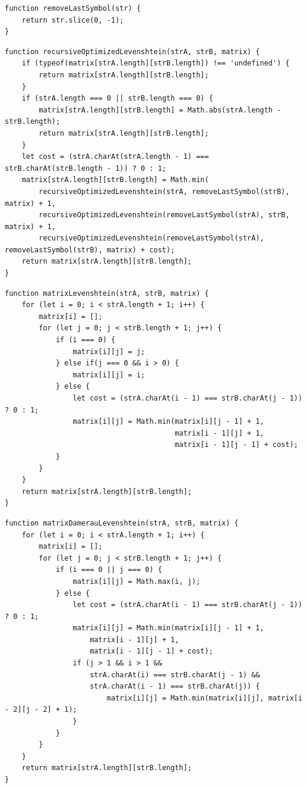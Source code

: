 \documentclass[12pt]{report}
\begin{document}
\begin{lstlisting}[label=some-code,caption=Функция удаления последнего символа в строке]
function removeLastSymbol(str) {
    return str.slice(0, -1);
}
\end{lstlisting}

\begin{lstlisting}[label=some-code,caption=Функция нахождения расстояния Левенштейна рекурсивно с матрицей]
function recursiveOptimizedLevenshtein(strA, strB, matrix) {
    if (typeof(matrix[strA.length][strB.length]) !== 'undefined') {
        return matrix[strA.length][strB.length];
    } 
    if (strA.length === 0 || strB.length === 0) {
        matrix[strA.length][strB.length] = Math.abs(strA.length - strB.length);
        return matrix[strA.length][strB.length];
    }
    let cost = (strA.charAt(strA.length - 1) === strB.charAt(strB.length - 1)) ? 0 : 1;
    matrix[strA.length][strB.length] = Math.min(
        recursiveOptimizedLevenshtein(strA, removeLastSymbol(strB), matrix) + 1,
        recursiveOptimizedLevenshtein(removeLastSymbol(strA), strB, matrix) + 1,
        recursiveOptimizedLevenshtein(removeLastSymbol(strA), removeLastSymbol(strB), matrix) + cost);
    return matrix[strA.length][strB.length];
}
\end{lstlisting}


\begin{lstlisting}[label=some-code,caption=Функция нахождения расстояния Левенштейна матрично]
function matrixLevenshtein(strA, strB, matrix) {
    for (let i = 0; i < strA.length + 1; i++) {
        matrix[i] = [];
        for (let j = 0; j < strB.length + 1; j++) {
            if (i === 0) {
                matrix[i][j] = j;
            } else if(j === 0 && i > 0) {
                matrix[i][j] = i;
            } else {
                let cost = (strA.charAt(i - 1) === strB.charAt(j - 1)) ? 0 : 1;
                matrix[i][j] = Math.min(matrix[i][j - 1] + 1,
                                        matrix[i - 1][j] + 1,
                                        matrix[i - 1][j - 1] + cost);
            }
        }
    }
    return matrix[strA.length][strB.length];
}
\end{lstlisting}

\begin{lstlisting}[label=some-code,caption=Функция нахождения расстояния Дамерау-Левенштейна матрично]
function matrixDamerauLevenshtein(strA, strB, matrix) {
    for (let i = 0; i < strA.length + 1; i++) {
        matrix[i] = [];
        for (let j = 0; j < strB.length + 1; j++) {
            if (i === 0 || j === 0) {
                matrix[i][j] = Math.max(i, j);
            } else {
                let cost = (strA.charAt(i - 1) === strB.charAt(j - 1)) ? 0 : 1;
                matrix[i][j] = Math.min(matrix[i][j - 1] + 1,
                    matrix[i - 1][j] + 1,
                    matrix[i - 1][j - 1] + cost);
                if (j > 1 && i > 1 && 
                    strA.charAt(i) === strB.charAt(j - 1) && 
                    strA.charAt(i - 1) === strB.charAt(j)) {
                        matrix[i][j] = Math.min(matrix[i][j], matrix[i - 2][j - 2] + 1);
                }
            }
        }
    }
    return matrix[strA.length][strB.length];
}
\end{lstlisting}
\end{document}
